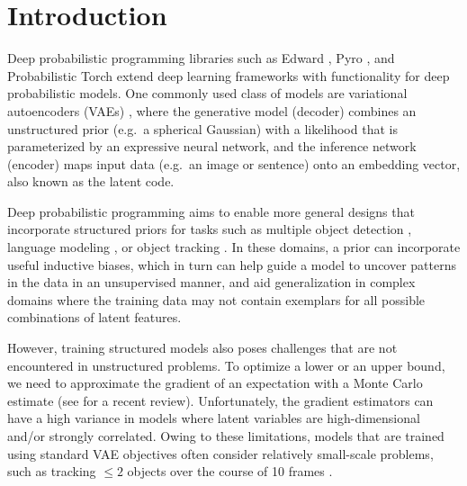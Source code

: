 \documentclass[anonymous=false, %
               format=acmsmall, %
               review=true, %
               screen=true, %
               nonacm=true]{acmart}
\theoremstyle{definition}
\begin{document}
\maketitle

\section{Introduction}

\label{introduction}

Deep probabilistic programming libraries such as Edward \cite{tran2016edward}, Pyro \cite{bingham2018pyro}, and Probabilistic Torch \cite{siddharth2017learning}  extend deep learning frameworks with functionality for deep probabilistic models. One commonly used class of models are 
variational autoencoders (VAEs) \cite{kingma2013auto-encoding, rezende2014stochastic}, where the generative model (decoder) combines an unstructured prior (e.g.~a spherical Gaussian) with a likelihood that is parameterized by an expressive neural network, and the inference network (encoder) maps input data (e.g.~an image or sentence) onto an embedding vector, also known as the latent code.

Deep probabilistic programming aims to enable more general designs that incorporate structured priors for tasks such as multiple object detection \cite{eslami2016attend}, language modeling \cite{esmaeili2019structured}, or object tracking \cite{kosiorek2018sequential}. In these domains, a prior can incorporate useful inductive biases, which in turn can help guide a model to uncover patterns in the data in an unsupervised manner, and aid generalization in complex domains where the training data may not contain exemplars for all possible combinations of latent features.

However, training structured models also poses challenges that are not encountered in unstructured problems. To optimize a lower or an upper bound, we need to approximate the gradient of an expectation with a Monte Carlo estimate (see \cite{mohamed2019monte} for a recent review).
Unfortunately, the gradient estimators can have a high variance in models where latent variables are high-dimensional and/or strongly correlated. Owing to these limitations, models that are trained using standard VAE objectives often consider relatively small-scale problems, such as tracking $\le 2$ objects over the course of 10 frames \cite{kosiorek2018sequential}.
\end{document}
